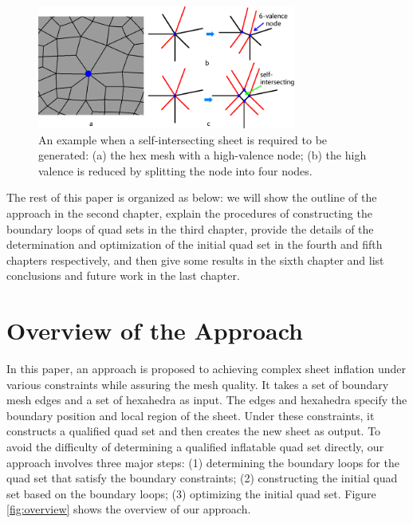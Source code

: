 \documentclass[final,5p,times,twocolumn]{elsarticle}
\begin{document}
\begin{figure}[htbp]
\begin{center}
\includegraphics[width=8.5cm]{rev_figures/intro_int_required.png}
\caption{An example when a self-intersecting sheet is required to be generated: (a) the hex mesh with a high-valence node; (b) the high valence is reduced by splitting the node into four nodes.}
\label{fig:intro_int_required}
\end{center}
\end{figure}

The rest of this paper is organized as below: we will show the outline of the approach in the second chapter, explain the procedures of constructing the boundary loops of quad sets in the third chapter, provide the details of the determination and optimization of the initial quad set in the fourth and fifth chapters respectively, and then give some results in the sixth chapter and list conclusions and future work in the last chapter.

\section{Overview of the Approach}
\label{sec:algo_overview}

In this paper, an approach is proposed to achieving complex sheet inflation under various constraints while assuring the mesh quality. It takes a set of boundary mesh edges and a set of hexahedra as input. The edges and hexahedra specify the boundary position and local region of the sheet. Under these constraints, it constructs a qualified quad set and then creates the new sheet as output. To avoid the difficulty of determining a qualified inflatable quad set directly, our approach involves three major steps: (1) determining the boundary loops for the quad set that satisfy the boundary constraints; (2) constructing the initial quad set based on the boundary loops; (3) optimizing the initial quad set. Figure \ref{fig:overview} shows the overview of our approach.
\end{document}
